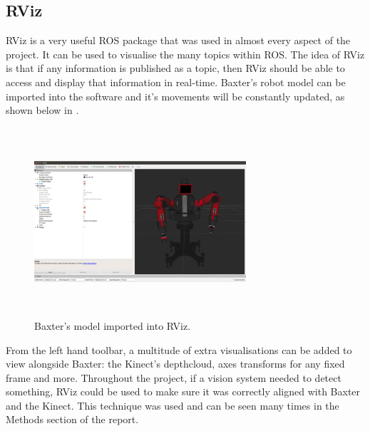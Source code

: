 \subsection{RViz}
RViz is a very useful ROS package that was used in almost every aspect of the project. It can be used to visualise the many topics within ROS. The idea of RViz is that if any information is published as a topic, then RViz should be able to access and display that information in real-time. Baxter's robot model can be imported into the software and it's movements will be constantly updated, as shown below in \textbf{}.
\begin{figure}[H]
        \centering 
        \includegraphics[width=0.7\textwidth, height=7cm]{rvizscreen.png}
        \caption{Baxter's model imported into RViz.}
        \label{fig:rvizscreen}
\end{figure} 
From the left hand toolbar, a multitude of extra visualisations can be added to view alongside Baxter: the Kinect's depthcloud, axes transforms for any fixed frame and more. Throughout the project, if a vision system needed to detect something, RViz could be used to make sure it was correctly aligned with Baxter and the Kinect. This technique was used and can be seen many times in the Methods section of the report.
